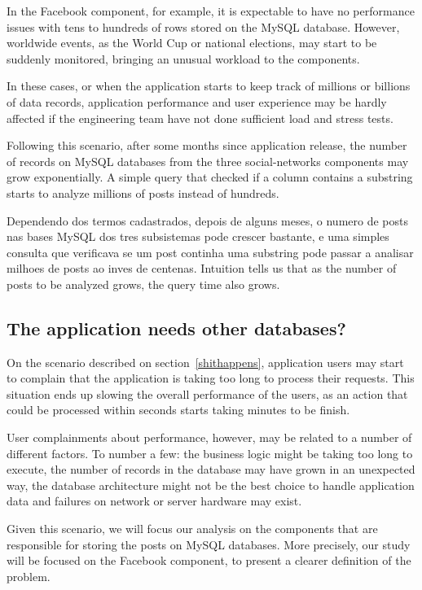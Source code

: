 In the Facebook component, for example, it is expectable to have no performance issues with tens to hundreds of rows stored on the MySQL database. However, worldwide events, as the World Cup or national elections, may start to be suddenly monitored, bringing an unusual workload to the components.  

In these cases, or when the application starts to keep track of millions or billions of data records, application performance and user experience may  be hardly affected if the engineering team have not done sufficient load and stress tests.   

Following this scenario, after some months since application release, the number of records on MySQL databases from the three social-networks components may grow exponentially. A simple query that checked if a column contains a substring starts to analyze millions of posts instead of hundreds.   

Dependendo dos termos cadastrados, depois de alguns meses, o numero de posts nas bases MySQL dos tres subsistemas pode crescer bastante, e uma simples consulta que verificava se um post continha uma substring pode passar a analisar milhoes de posts ao inves de centenas. Intuition tells us that as the number of posts to be analyzed grows, the query time also grows.

\subsection{The application needs other databases?}
\label{anotherdb}
On the scenario described on section~\ref{shithappens}, application users may start to complain that the application is taking too long to process their requests. This situation ends up slowing the overall performance of the users, as an action that could be processed within seconds starts taking minutes to be finish.  

User complainments about performance, however, may be related to a number of different factors. To number a few: the business logic might be taking too long to execute, the number of records in the database may have grown in an unexpected way, the database architecture might not be the best choice to handle application data and failures on network or server hardware may exist. 

Given this scenario, we will focus our analysis on the components that are responsible for storing the posts on MySQL databases. More precisely, our study will be focused on the Facebook component, to present a clearer definition of the problem.

